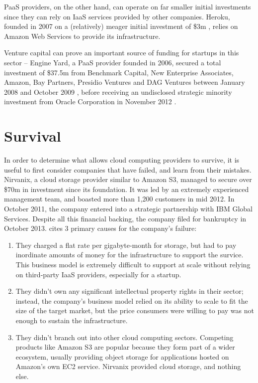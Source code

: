 \documentclass[a4paper]{proc}
\begin{document}
  PaaS providers, on the other hand, can operate on far smaller initial investments since they can rely on IaaS services provided by other companies. Heroku, founded in 2007 on a (relatively) meager initial investment of \$3m \cite{Hendrickson2008}, relies on Amazon Web Services to provide its infrastructure.

  Venture capital can prove an important source of funding for startups in this sector -- Engine Yard, a PaaS provider founded in 2006, secured a total investment of \$37.5m from Benchmark Capital, New Enterprise Associates, Amazon, Bay Partners, Presidio Ventures and DAG Ventures between January 2008 and October 2009 \cite{Schonfeld2008} \cite{Lerner2008}, before receiving an undisclosed strategic minority investment from Oracle Corporation in November 2012 \cite{Oracle2012}.

  \section{Survival}
  \label{sec:survival}


  In order to determine what allows cloud computing providers to survive, it is useful to first consider companies that have failed, and learn from their mistakes. Nirvanix, a cloud storage provider similar to Amazon S3, managed to secure over \$70m in investment since its foundation. It was led by an extremely experienced management team, and boasted more than 1,200 customers in mid 2012. In October 2011, the company entered into a strategic partnership with IBM Global Services. Despite all this financial backing, the company filed for bankruptcy in October 2013. \textcite{Robinson2013} cites 3 primary causes for the company's failure:

  \begin{enumerate}
    \item They charged a flat rate per gigabyte-month for storage, but had to pay inordinate amounts of money for the infrastructure to support the survice. This business model is extremely difficult to support at scale without relying on third-party IaaS providers, especially for a startup.
    \item They didn't own any significant intellectual property rights in their sector; instead, the company's business model relied on its ability to scale to fit the size of the target market, but the price consumers were willing to pay was not enough to sustain the infrastructure.
    \item They didn't branch out into other cloud computing sectors. Competing products like Amazon S3 are popular because they form part of a wider ecosystem, usually providing object storage for applications hosted on Amazon's own EC2 service. Nirvanix provided cloud storage, and nothing else.
  \end{enumerate}
\end{document}
